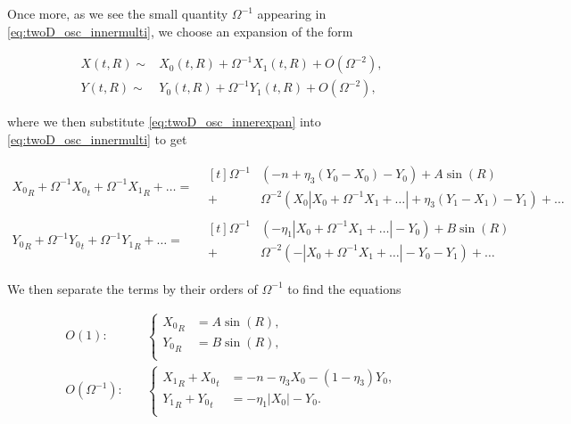 Once more, as we see the small quantity $\Omega^{-1}$ appearing in \eqref{eq:twoD_osc_innermulti}, we choose an expansion of the form

\begin{equation}\label{eq:twoD_osc_innerexpan}
\begin{aligned}
X(t,R)\sim& X_0(t,R)+\Omega^{-1}X_1(t,R)+O(\Omega^{-2}),\\
Y(t,R)\sim& Y_0(t,R)+\Omega^{-1}Y_1(t,R)+O(\Omega^{-2}),
\end{aligned}
\end{equation}

where we then substitute \eqref{eq:twoD_osc_innerexpan} into \eqref{eq:twoD_osc_innermulti} to get

\begin{equation*}
\begin{aligned}
{X_0}_R+\Omega^{-1}{X_0}_t+\Omega^{-1}{X_1}_R+\ldots=&\begin{aligned}[t]\Omega^{-1}&(-n+\eta_3(Y_0-X_0)-Y_0)+A\sin(R)\\
+&\Omega^{-2}(X_0|X_0+\Omega^{-1}X_1+\ldots|+\eta_3(Y_1-X_1)-Y_1)+\ldots
\end{aligned}\\
{Y_0}_R+\Omega^{-1}{Y_0}_t+\Omega^{-1}{Y_1}_R+\ldots=&\begin{aligned}[t]\Omega^{-1}&(-\eta_1|X_0+\Omega^{-1}X_1+\ldots|-Y_0)+B\sin(R)\\
+&\Omega^{-2}(-|X_0+\Omega^{-1}X_1+\ldots|-Y_0-Y_1)+\ldots
\end{aligned}
\end{aligned}
\end{equation*}

We then separate the terms by their orders of $\Omega^{-1}$ to find the equations

\begin{align}
\label{eq:twoD_osc_innerO1}
O(1):\quad & \begin{cases}
	{X_0}_R &= A\sin(R), \\
	{Y_0}_R &= B\sin(R),\\
\end{cases}\\
\label{eq:twoD_osc_innerO2}
O(\Omega^{-1}):\quad & \begin{cases}
	{X_1}_R+{X_0}_t &= -n-\eta_3X_0-(1-\eta_3)Y_0, \\
	{Y_1}_R+{Y_0}_t &= -\eta_1|X_0|-Y_0.\\
\end{cases}
\end{align}

